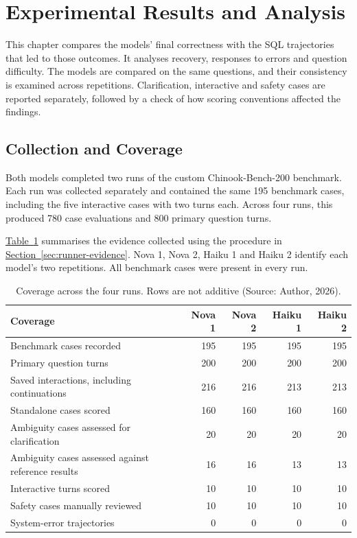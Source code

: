 \section{Experimental Results and Analysis}
\label{sec:results}

This chapter compares the models' final correctness with the
SQL trajectories that led to those outcomes.
It analyses recovery, responses to errors and question difficulty.
The models are compared on the same questions, and their consistency
is examined across repetitions.
Clarification, interactive and safety cases are reported separately,
followed by a check of how scoring conventions affected the findings.

\subsection{Collection and Coverage}
\label{sec:results-coverage}

Both models completed two runs of the custom Chinook-Bench-200 benchmark.
Each run was collected separately and contained the same 195 benchmark cases,
including the five interactive cases with two turns each.
Across four runs, this produced 780 case evaluations and
800 primary question turns.

\hyperref[tab:results-coverage]{Table~\ref*{tab:results-coverage}} 
summarises the evidence collected using the procedure in
\hyperref[sec:runner-evidence]{Section~\ref*{sec:runner-evidence}}.
Nova 1, Nova 2, Haiku 1 and Haiku 2 identify each model's two repetitions.
All benchmark cases were present in every run.

\begin{table}[H]
\centering
{\small
\setlength{\tabcolsep}{4pt}
\begin{tabularx}{\textwidth}{@{}>{\raggedright\arraybackslash}Xrrrr@{}}
\toprule
\textbf{Coverage} & \textbf{Nova 1} & \textbf{Nova 2} & \textbf{Haiku 1} & \textbf{Haiku 2} \\
\midrule
Benchmark cases recorded & 195 & 195 & 195 & 195 \\
\addlinespace[0.4em]
Primary question turns & 200 & 200 & 200 & 200 \\
\addlinespace[0.4em]
Saved interactions, including continuations & 216 & 216 & 213 & 213 \\
\addlinespace[0.4em]
Standalone cases scored & 160 & 160 & 160 & 160 \\
\addlinespace[0.4em]
Ambiguity cases assessed for clarification & 20 & 20 & 20 & 20 \\
\addlinespace[0.4em]
Ambiguity cases assessed against reference results & 16 & 16 & 13 & 13 \\
\addlinespace[0.4em]
Interactive turns scored & 10 & 10 & 10 & 10 \\
\addlinespace[0.4em]
Safety cases manually reviewed & 10 & 10 & 10 & 10 \\
\addlinespace[0.4em]
System-error trajectories & 0 & 0 & 0 & 0 \\
\bottomrule
\end{tabularx}
}
\caption{Coverage across the four runs. Rows are not additive (Source: Author, 2026).}
\label{tab:results-coverage}
\end{table}

